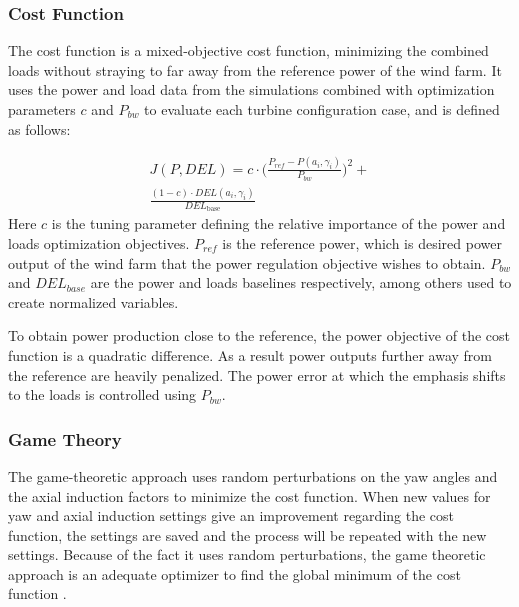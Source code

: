\subsubsection{Cost Function} \label{sec:costfunction}

The cost function is a mixed-objective cost function, minimizing the combined loads without straying to far away from the reference power of the wind farm. It uses the power and load data from the simulations combined with optimization parameters $c$ and $P_{bw}$ to evaluate each turbine configuration case, and is defined as follows: 

\begin{equation}
\begin{aligned}
J(P,DEL) = c\cdot\Big(\frac{P_{ref}-P(a_i,\gamma_i)}{P_{bw}}\Big)^2  + \\
\frac{(1-c)\cdot DEL(a_i,\gamma_i)}{DEL_\text{{base}}}
\end{aligned}
 \label{eq:costf}
\end{equation}
Here $c$ is the tuning parameter defining the relative importance of the power and loads optimization objectives. $P_{ref}$ is the reference power, which is desired power output of the wind farm that the power regulation objective wishes to obtain. $P_{bw}$ and $DEL_{base}$ are the power and loads baselines respectively, among others used to create normalized variables.
\newline

To obtain power production close to the reference, the power objective of the cost function is a quadratic difference. As a result power outputs further away from the reference are heavily penalized. The power error at which the emphasis shifts to the loads is controlled using $P_{bw}$.


\subsubsection{Game Theory} \label{sec:gametheory}
The game-theoretic approach uses random perturbations on the yaw angles and the axial induction factors to minimize the cost function. When new values for yaw and axial induction settings give an improvement regarding the cost function, the settings are saved and the process will be repeated with the new settings. Because of the fact it uses random perturbations, the game theoretic approach is an adequate optimizer to find the global minimum of the cost function \cite{Dijk2016}.





